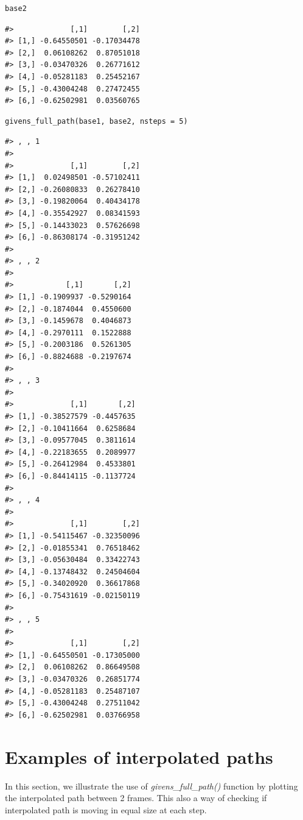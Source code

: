 \begin{verbatim}
base2
\end{verbatim}

\begin{verbatim}
#>             [,1]        [,2]
#> [1,] -0.64550501 -0.17034478
#> [2,]  0.06108262  0.87051018
#> [3,] -0.03470326  0.26771612
#> [4,] -0.05281183  0.25452167
#> [5,] -0.43004248  0.27472455
#> [6,] -0.62502981  0.03560765
\end{verbatim}

\begin{verbatim}
givens_full_path(base1, base2, nsteps = 5)
\end{verbatim}

\begin{verbatim}
#> , , 1
#> 
#>             [,1]        [,2]
#> [1,]  0.02498501 -0.57102411
#> [2,] -0.26080833  0.26278410
#> [3,] -0.19820064  0.40434178
#> [4,] -0.35542927  0.08341593
#> [5,] -0.14433023  0.57626698
#> [6,] -0.86308174 -0.31951242
#> 
#> , , 2
#> 
#>            [,1]       [,2]
#> [1,] -0.1909937 -0.5290164
#> [2,] -0.1874044  0.4550600
#> [3,] -0.1459678  0.4046873
#> [4,] -0.2970111  0.1522888
#> [5,] -0.2003186  0.5261305
#> [6,] -0.8824688 -0.2197674
#> 
#> , , 3
#> 
#>             [,1]       [,2]
#> [1,] -0.38527579 -0.4457635
#> [2,] -0.10411664  0.6258684
#> [3,] -0.09577045  0.3811614
#> [4,] -0.22183655  0.2089977
#> [5,] -0.26412984  0.4533801
#> [6,] -0.84414115 -0.1137724
#> 
#> , , 4
#> 
#>             [,1]        [,2]
#> [1,] -0.54115467 -0.32350096
#> [2,] -0.01855341  0.76518462
#> [3,] -0.05630484  0.33422743
#> [4,] -0.13748432  0.24504604
#> [5,] -0.34020920  0.36617868
#> [6,] -0.75431619 -0.02150119
#> 
#> , , 5
#> 
#>             [,1]        [,2]
#> [1,] -0.64550501 -0.17305000
#> [2,]  0.06108262  0.86649508
#> [3,] -0.03470326  0.26851774
#> [4,] -0.05281183  0.25487107
#> [5,] -0.43004248  0.27511042
#> [6,] -0.62502981  0.03766958
\end{verbatim}

\hypertarget{examples-of-interpolated-paths}{%
\section{Examples of interpolated paths}\label{examples-of-interpolated-paths}}

In this section, we illustrate the use of \emph{givens\_full\_path()} function by plotting the interpolated path between 2 frames. This also a way of checking if interpolated path is moving in equal size at each step.

